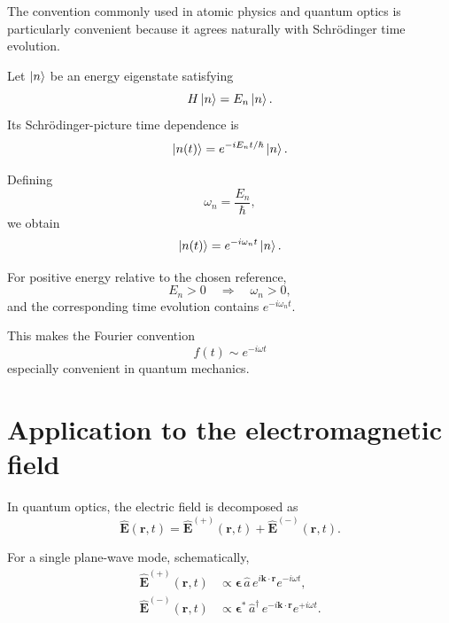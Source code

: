\documentclass[11pt]{article}
\begin{document}
The convention commonly used in atomic physics and quantum optics is particularly convenient because it agrees naturally with Schr\"odinger time evolution.

Let $\ket{n}$ be an energy eigenstate satisfying
\begin{equation}
H\ket{n}=E_n\ket{n}.
\label{eq:energy-eigenstate}
\end{equation}
Its Schr\"odinger-picture time dependence is
\begin{equation}
\ket{n(t)}
=
e^{-iE_nt/\hbar}\ket{n}.
\label{eq:schrodinger-evolution}
\end{equation}

Defining
\begin{equation}
\omega_n=\frac{E_n}{\hbar},
\label{eq:omega-energy}
\end{equation}
we obtain
\begin{equation}
\ket{n(t)}
=
e^{-i\omega_nt}\ket{n}.
\label{eq:energy-frequency-evolution}
\end{equation}

For positive energy relative to the chosen reference,
\begin{equation}
E_n>0
\quad\Longrightarrow\quad
\omega_n>0,
\end{equation}
and the corresponding time evolution contains $e^{-i\omega_nt}$.

This makes the Fourier convention
\begin{equation}
f(t)\sim e^{-i\omega t}
\end{equation}
especially convenient in quantum mechanics.

\section{Application to the electromagnetic field}

In quantum optics, the electric field is decomposed as
\begin{equation}
\widehat{\bm E}(\bm r,t)
=
\widehat{\bm E}^{(+)}(\bm r,t)
+
\widehat{\bm E}^{(-)}(\bm r,t).
\label{eq:quantum-field-decomposition}
\end{equation}

For a single plane-wave mode, schematically,
\begin{align}
\widehat{\bm E}^{(+)}(\bm r,t)
&\propto
\bm\epsilon\,
\hat a\,
e^{i\bm k\cdot\bm r}
e^{-i\omega t},
\label{eq:quantum-positive-field}\\
\widehat{\bm E}^{(-)}(\bm r,t)
&\propto
\bm\epsilon^*\,
\hat a^\dagger\,
e^{-i\bm k\cdot\bm r}
e^{+i\omega t}.
\label{eq:quantum-negative-field}
\end{align}
\end{document}
